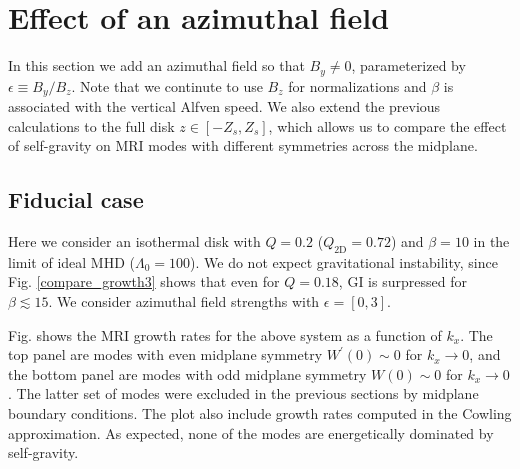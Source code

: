 \section{Effect of an azimuthal field}
In this section we add an azimuthal field so that $B_y\neq 0$,  
parameterized by $\epsilon \equiv B_y/B_z$. Note that we continute to
use $B_z$ for normalizations and $\beta$ is associated with the
vertical Alfven speed. We also extend the previous calculations to the
full disk $z\in[-Z_s,Z_s]$, which allows us to compare the effect of
self-gravity on MRI modes with different symmetries across the
midplane. 

\subsection{Fiducial case}
Here we consider an isothermal disk with $Q=0.2$
($Q_\mathrm{2D}=0.72$) and $\beta=10$ in the limit of ideal MHD
($\Lambda_0=100$). We do not expect gravitational instability, since
Fig. \ref{compare_growth3} shows that even for $Q=0.18$, GI is
surpressed for $\beta \lesssim 15$. We consider azimuthal field
strengths with $\epsilon=[0,3]$. 


Fig. shows the MRI growth rates for the above system as a function of
$k_x$. The top panel are modes with even midplane symmetry
$W^\prime(0)\sim 0$ for $k_x\to0$, and the bottom panel are modes with odd midplane 
symmetry $W(0)\sim 0$ for $k_x\to0$. The latter set of modes were
excluded in the previous sections by midplane boundary
conditions. The plot also include growth rates computed in the Cowling
approximation. As expected, none of the modes are energetically
dominated by self-gravity. 


